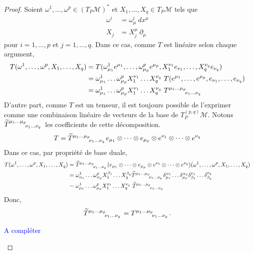 \documentclass[a4paper,11pt]{report}
\theoremstyle{definition}
\theoremstyle{plain}
\theoremstyle{definition}
\theoremstyle{remark}
\newcommand{\comp}{\begin{center}\textcolor{blue}{A compléter}\end{center}}
\newcommand{\M}{\mathscr{M}}
\newcommand{\p}{\partial}
\begin{document}
                \begin{proof}
                   Soient $\omega^1,\dots,\omega^p\in(T_P\M)^*$ et $X_1,\dots,X_q\in T_P\M$ tels que 
                    \begin{align}
                        \omega^i &= \omega^i_\mu ~dx^\mu \\
                        X_j &= X^\mu_j~\p_\mu
                    \end{align}
                    pour $i=1,\dots,p$ et $j=1,\dots,q$. Dans ce cas, comme $T$ est linéaire selon chaque argument,
                    \begin{align}
                        T(\omega^1,\dots,\omega^p,X_1,\dots,X_q) &= T(\omega^1_{\mu_1}e^{\mu_1},\dots,\omega^p_{\mu_p}e^{\mu_p},X^{\nu_1}_1e_{\nu_1},\dots,X^{\nu_q}_qe_{\nu_q}) \\
                        &=\omega^1_{\mu_1}\dots\omega^p_{\mu_p}X^{\nu_1}_1\dots X^{\nu_q}_q~T(e^{\mu_1},\dots,e^{\mu_p},e_{\nu_1},\dots,e_{\nu_q}) \\
                        &= \omega^1_{\mu_1}\dots\omega^p_{\mu_p}X^{\nu_1}_1\dots X^{\nu_q}_q~ T\indices{^{\mu_1\dots\mu_p}_{\nu_1\dots\nu_q}}
                    \end{align}
                    D'autre part, comme $T$ est un tenseur, il est toujours possible de l'exprimer comme une combinaison linéaire de vecteurs de la base de $T^{(p,q)}_P\M$. Notons $\widetilde{T}\indices{^{\mu_1\dots\mu_p}_{\nu_1\dots\nu_q}}$ les coefficients de cette décomposition.
                    \begin{equation}
                        T = \widetilde{T}\indices{^{\mu_1\dots\mu_p}_{\nu_1\dots\nu_q}} e_{\mu_1}\otimes\dots\otimes e_{\mu_p}\otimes e^{\nu_1}\otimes\dots\otimes e^{\nu_q}
                    \end{equation}
                    Dans ce cas, par propriété de base duale,
                    \begin{align}
                        T(\omega^1,\dots,\omega^p,X_1,\dots,X_q) &= \widetilde{T}\indices{^{\mu_1\dots\mu_p}_{\nu_1\dots\nu_q}} (e_{\mu_1}\otimes\dots\otimes e_{\mu_p}\otimes e^{\nu_1}\otimes\dots\otimes e^{\nu_q})(\omega^1,\dots,\omega^p,X_1,\dots,X_q)\\
                        &= \omega^1_{\alpha_1}\dots\omega^p_{\alpha_p}X^{\beta_1}_1\dots X^{\beta_q}_q \widetilde{T}\indices{^{\mu_1\dots\mu_p}_{\nu_1\dots\nu_q}} \delta^{\alpha_1}_{\mu_1}\dots\delta^{\alpha_p}_{\mu_p}\delta^{\nu_1}_{\beta_1}\dots\delta^{\nu_q}_{\beta_q}\\
                        &= \omega^1_{\mu_1}\dots\omega^p_{\mu_p}X^{\nu_1}_1\dots X^{\nu_q}_q~ \widetilde{T}\indices{^{\mu_1\dots\mu_p}_{\nu_1\dots\nu_q}}
                    \end{align}
                    Donc, 
                    \begin{equation}
                        \widetilde{T}\indices{^{\mu_1\dots\mu_p}_{\nu_1\dots\nu_q}} = T\indices{^{\mu_1\dots\mu_p}_{\nu_1\dots\nu_q}}.
                    \end{equation}
                    
                    \comp
                \end{proof}
                
\end{document}
